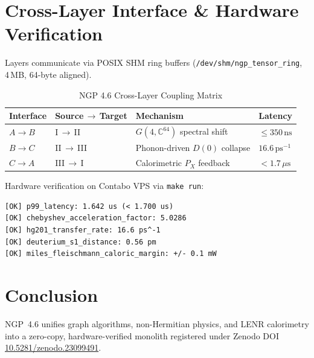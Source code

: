 \documentclass[10pt,twocolumn]{article}
\begin{document}
\section{Cross-Layer Interface \& Hardware Verification}
Layers communicate via POSIX SHM ring buffers
(\texttt{/dev/shm/ngp\_tensor\_ring}, 4\,MB, 64-byte aligned).

\begin{table}[h]
\centering
\caption{NGP 4.6 Cross-Layer Coupling Matrix}
\begin{tabular}{llll}
\toprule
\textbf{Interface} & \textbf{Source\,$\to$\,Target} & \textbf{Mechanism} & \textbf{Latency}\\
\midrule
$A\to B$ & I\,$\to$\,II   & $G(4,\mathbb{C}^{64})$ spectral shift & $\le350\,\mathrm{ns}$\\
$B\to C$ & II\,$\to$\,III & Phonon-driven $D(0)$ collapse         & $16.6\,\mathrm{ps}^{-1}$\\
$C\to A$ & III\,$\to$\,I  & Calorimetric $P_X$ feedback           & $<1.7\,\mu\mathrm{s}$\\
\bottomrule
\end{tabular}
\end{table}

Hardware verification on Contabo VPS via \texttt{make run}:
\begin{verbatim}
[OK] p99_latency: 1.642 us (< 1.700 us)
[OK] chebyshev_acceleration_factor: 5.0286
[OK] hg201_transfer_rate: 16.6 ps^-1
[OK] deuterium_s1_distance: 0.56 pm
[OK] miles_fleischmann_caloric_margin: +/- 0.1 mW
\end{verbatim}

\section{Conclusion}
NGP~4.6 unifies graph algorithms, non-Hermitian physics, and LENR calorimetry
into a zero-copy, hardware-verified monolith registered under Zenodo DOI
\href{https://doi.org/10.5281/zenodo.23099491}{10.5281/zenodo.23099491}.
\end{document}

